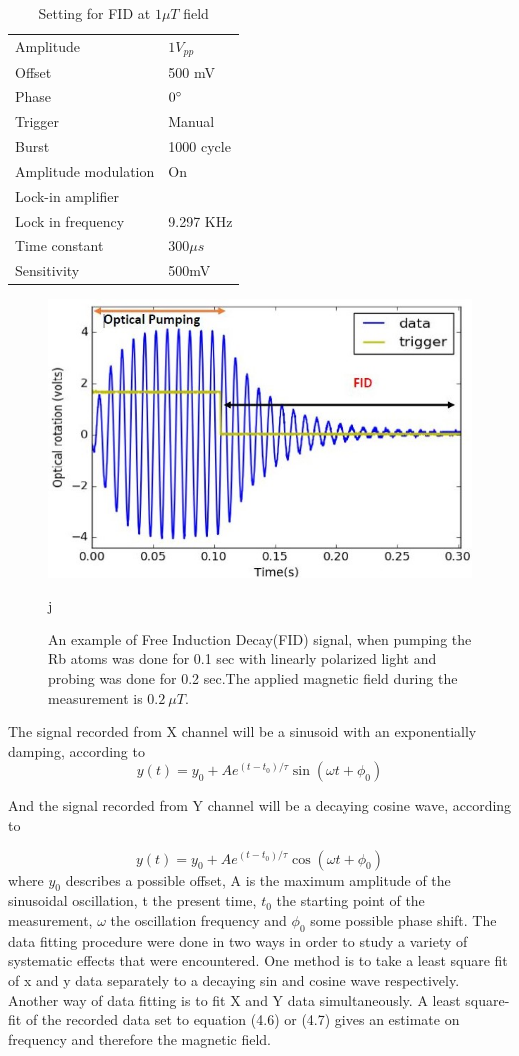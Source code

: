 \begin{itemize}
\begin{table}[h]
\begin{tabular}{|l |l|}
Amplitude   &  $1V_{pp}$  \\
Offset  &       500 mV  \\
Phase       &    $0\degree$ \\
Trigger     &   Manual  \\
Burst       &    1000 cycle \\
Amplitude modulation & On \\
\hline
Lock-in amplifier &     \\
\hline
Lock in frequency     & 9.297 KHz \\
Time constant     &  $300\mu s$ \\
Sensitivity      &  500mV  \\
\hline
\end{tabular}
\caption{Setting for FID at $1\mu T$ field}
\end{table}
\begin{figure}[h]
\centering\includegraphics[width=0.55\linewidth]{figures/Capture2}
\caption{ An example of Free Induction Decay(FID) signal, when pumping the Rb atoms  was done for 0.1 sec with linearly polarized light and probing was done for 0.2 sec.The applied magnetic field during the measurement is $0.2~\mu T$. }j
\end{figure}
The signal recorded  from X channel will be a sinusoid with an exponentially damping, according to   
  \begin{equation}
                                         y(t) = y_0 + A   e^{(t-t_0)/\tau}\sin(\omega t + \phi_0)
\end{equation}  

And the signal recorded  from Y channel will be a decaying cosine wave, according to
                                       
  \begin{equation}
                                         y(t) = y_0 + A   e^{(t-t_0)/\tau}\cos(\omega t + \phi_0)
\end{equation}
where $y_0$ describes a possible offset, A is the maximum amplitude of the sinusoidal oscillation,
t the present time, $t_0$ the starting point of the measurement, $\omega$ the oscillation frequency and $\phi_0$  some possible phase shift. The data fitting procedure were done in two ways in order to study a variety of systematic effects that were encountered. One method is to take a least square fit of x and y data separately to a decaying sin and cosine wave respectively. Another way of data fitting is to fit X and Y data simultaneously. A least square-fit of the recorded data set to equation (4.6) or (4.7) gives an estimate on frequency and  therefore the magnetic field.
\begin{figure}
    \centering
 

\end{figure}
\end{itemize}
